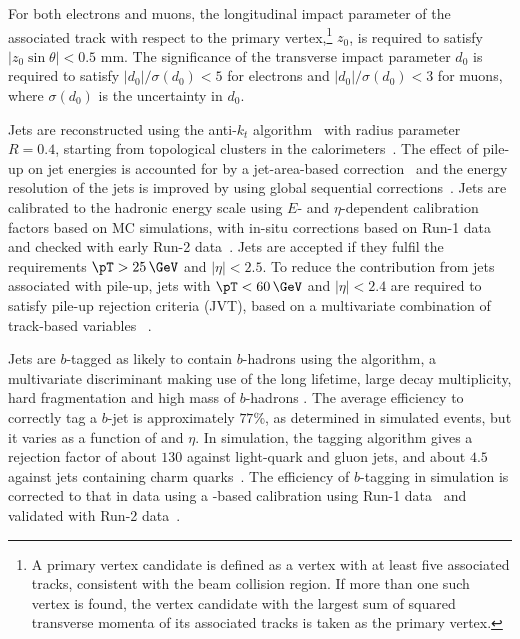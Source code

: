 For both electrons and muons, the longitudinal impact parameter of the
associated track with respect to the primary vertex,\footnote{A primary vertex
candidate is defined as a vertex with at least five associated tracks,
consistent with the beam collision region.  If more than one such vertex is
found, the vertex candidate with the largest sum of squared transverse momenta
of its associated tracks is taken as the primary vertex.} $z_{0}$, is required
to satisfy $|z_0 \sin\theta|<0.5$ mm. The significance of the transverse impact
parameter $d_0$ is required to satisfy $|d_0|/\sigma(d_0)<5$ for electrons and
$|d_0|/\sigma(d_0)<3$ for muons, where $\sigma(d_0)$ is the uncertainty in
$d_0$.

Jets are reconstructed using the anti-$k_t$ algorithm~\cite{Cacciari:2008gp,
Cacciari:2005hq} with radius parameter $R = 0.4$, starting from topological
clusters in the calorimeters~\cite{Aad:2016upy}. The effect of pile-up on jet
energies is accounted for by a jet-area-based correction~\cite{Cacciari:2008gn}
and the energy resolution of the jets is improved by using global sequential
corrections~\cite{ATLAS-CONF-2015-002}. Jets are calibrated to the hadronic
energy scale using $E$- and $\eta$-dependent calibration factors based on MC
simulations, with in-situ corrections based on Run-1 data~\cite{PERF-2011-03,
ATLAS-CONF-2015-037} and checked with early Run-2
data~\cite{ATL-PHYS-PUB-2015-015}.  Jets are accepted if they fulfil the
requirements $\pT > 25\,\GeV$ and $|\eta| < 2.5$. To reduce the contribution
from jets associated with pile-up, jets with $\pT < 60\,\GeV$ and $|\eta| < 2.4$
are required to satisfy pile-up rejection criteria (JVT), based on a multivariate
combination of track-based variables ~\cite{PERF-2014-03}. 



Jets are $b$-tagged as likely to contain $b$-hadrons using the 
algorithm, a multivariate discriminant making use of the long lifetime, large
decay multiplicity, hard fragmentation and high mass of $b$-hadrons
\cite{PERF-2012-04}.  The average efficiency to correctly tag a $b$-jet is
approximately $77\%$, as determined in simulated \ttbar events, but it varies as
a function of \pT and $\eta$.  In simulation, the tagging algorithm gives a
rejection factor of about $130$ against light-quark and gluon jets, and about
$4.5$ against jets containing charm quarks~\cite{ATL-PHYS-PUB-2015-022}.  The
efficiency of $b$-tagging in simulation is corrected to that in data using a
\ttbar-based calibration using Run-1 data~\cite{ATLAS-CONF-2014-004} and
validated with Run-2 data~\cite{ATL-PHYS-PUB-2015-039}.


